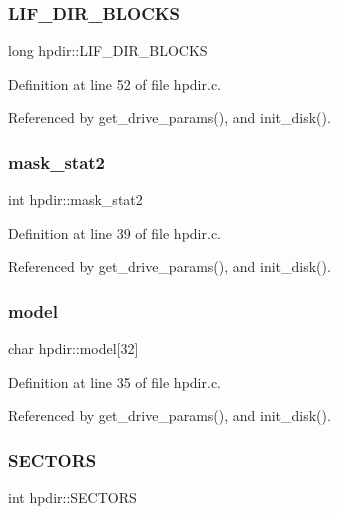 \subsubsection{\texorpdfstring{L\+I\+F\+\_\+\+D\+I\+R\+\_\+\+B\+L\+O\+C\+KS}{LIF\_DIR\_BLOCKS}}
{\footnotesize\ttfamily long hpdir\+::\+L\+I\+F\+\_\+\+D\+I\+R\+\_\+\+B\+L\+O\+C\+KS}



Definition at line 52 of file hpdir.\+c.



Referenced by get\+\_\+drive\+\_\+params(), and init\+\_\+disk().

\mbox{\label{structhpdir_ae5df4f2faefc4eafab4d4f8f76174c65}} 
\subsubsection{\texorpdfstring{mask\+\_\+stat2}{mask\_stat2}}
{\footnotesize\ttfamily int hpdir\+::mask\+\_\+stat2}



Definition at line 39 of file hpdir.\+c.



Referenced by get\+\_\+drive\+\_\+params(), and init\+\_\+disk().

\mbox{\label{structhpdir_ae561ebb76038ed1dfe4b2511d445ad55}} 
\subsubsection{\texorpdfstring{model}{model}}
{\footnotesize\ttfamily char hpdir\+::model\mbox{[}32\mbox{]}}



Definition at line 35 of file hpdir.\+c.



Referenced by get\+\_\+drive\+\_\+params(), and init\+\_\+disk().

\mbox{\label{structhpdir_aa2e7dc978d5e9323fc2de846070b2c14}} 
\subsubsection{\texorpdfstring{S\+E\+C\+T\+O\+RS}{SECTORS}}
{\footnotesize\ttfamily int hpdir\+::\+S\+E\+C\+T\+O\+RS}



